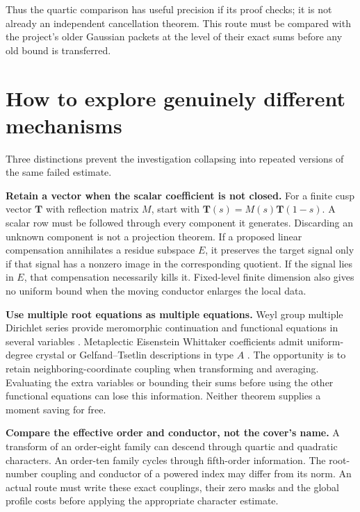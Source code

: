 \documentclass[11pt]{article}
\begin{document}
Thus the quartic comparison has useful precision if its proof checks;
it is not already an independent cancellation theorem. This route must
be compared with the project's older Gaussian packets at the level
of their exact sums before any old bound is transferred.

\section{How to explore genuinely different mechanisms}

Three distinctions prevent the investigation collapsing into repeated
versions of the same failed estimate.

\textbf{Retain a vector when the scalar coefficient is not closed.}
For a finite cusp vector $\mathbf T$ with reflection matrix $M$,
start with $\mathbf T(s)=M(s)\mathbf T(1-s)$.
A scalar row must be followed through every component it generates.
Discarding an unknown component is not a projection theorem.
If a proposed linear compensation annihilates a residue subspace $E$,
it preserves the target signal only if that signal has a nonzero
image in the corresponding quotient. If the signal lies in $E$,
that compensation necessarily kills it.
Fixed-level finite dimension also gives no uniform bound when the
moving conductor enlarges the local data.

\textbf{Use multiple root equations as multiple equations.}
Weyl group multiple Dirichlet series provide meromorphic continuation
and functional equations in several variables \cite{CG}.
Metaplectic Eisenstein Whittaker coefficients admit uniform-degree
crystal or Gelfand--Tsetlin descriptions in type $A$ \cite{BBF}.
The opportunity is to retain neighboring-coordinate coupling when
transforming and averaging. Evaluating the extra variables or bounding
their sums before using the other functional equations can lose this
information. Neither theorem supplies a moment saving for free.

\textbf{Compare the effective order and conductor, not the cover's name.}
A transform of an order-eight family can descend through quartic and
quadratic characters. An order-ten family cycles through fifth-order
information. The root-number coupling and conductor of a powered index
may differ from its norm. An actual route must write these exact
couplings, their zero masks and the global profile costs before applying
the appropriate character estimate.
\end{document}
